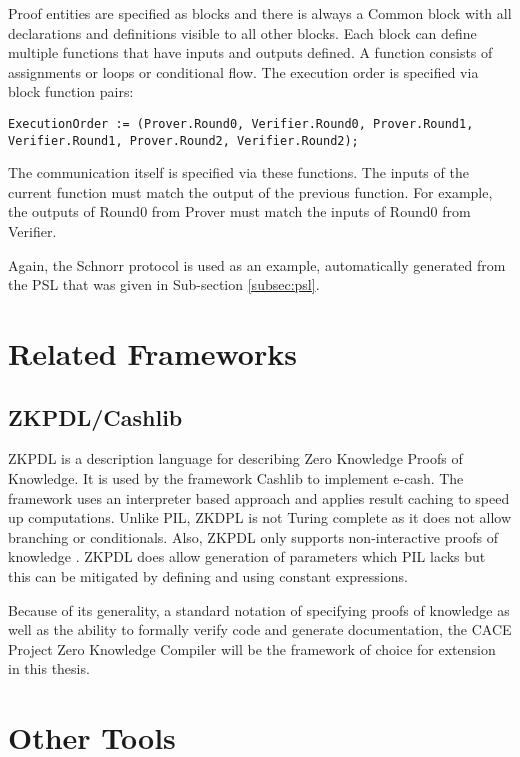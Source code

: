 Proof entities are specified as blocks and there is always a Common
block with all declarations and definitions visible to all other
blocks. Each block can define multiple functions that have inputs and outputs
defined. A function consists of assignments or loops or conditional
flow. The execution order is specified via block function pairs:
\begin{lstlisting}[language=PIL]
ExecutionOrder := (Prover.Round0, Verifier.Round0, Prover.Round1, Verifier.Round1, Prover.Round2, Verifier.Round2);
\end{lstlisting}
The communication itself is specified via these functions. The inputs
of the current function must match the output of the previous
function. For example, the outputs of Round0 from Prover must match
the inputs of Round0 from Verifier.

Again, the Schnorr protocol is used as an example, automatically
generated from the PSL that was given in Sub-section \ref{subsec:psl}.


\section{Related Frameworks}

\subsection{ZKPDL/Cashlib}

ZKPDL is a description language for describing Zero Knowledge Proofs
of Knowledge. It is used by the framework Cashlib to implement
e-cash. The framework uses an interpreter based approach and applies
result caching to speed up computations. Unlike PIL, ZKDPL is not
Turing complete as it does not allow branching or conditionals. Also,
ZKPDL only supports non-interactive proofs of knowledge
\cite{zkpdl}. ZKPDL does allow generation of parameters which PIL
lacks \cite{yaczk} but this can be mitigated by defining and using
constant expressions.

Because of its generality, a standard notation of specifying proofs of
knowledge as well as the ability to formally verify code and generate
documentation, the CACE Project Zero Knowledge Compiler will be the
framework of choice for extension in this thesis.

\section{Other Tools}

